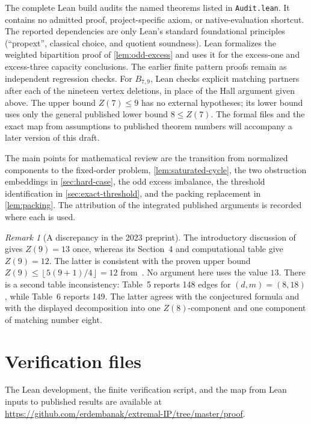 \documentclass[11pt]{article}
\theoremstyle{definition}
\theoremstyle{remark}
\newtheorem{remark}[theorem]{Remark}
\newcommand{\floor}[1]{\left\lfloor #1\right\rfloor}
\begin{document}
The complete Lean build audits the named theorems listed in
\texttt{Audit.lean}. It contains no admitted proof, project-specific axiom,
or native-evaluation shortcut. The reported dependencies are only Lean's
standard foundational principles
(``propext'', classical choice, and quotient soundness). Lean formalizes the
weighted bipartition proof of \cref{lem:odd-excess} and uses it for the
excess-one and excess-three capacity conclusions. The earlier finite pattern
proofs remain as independent regression checks.
For $B_{7,9}$, Lean checks explicit matching partners after each of the
nineteen vertex deletions, in place of the Hall argument given above.
The upper bound $Z(7)\le9$ has no external hypotheses; its lower bound uses
only the general published lower bound $8\le Z(7)$.
The formal files and the exact map from assumptions to published theorem
numbers will accompany a later version of this draft.

The main points for mathematical review are the transition from normalized
components to the fixed-order problem, \cref{lem:saturated-cycle}, the two
obstruction embeddings in \cref{sec:hard-case}, the odd excess imbalance,
the threshold identification in \cref{sec:exact-threshold}, and the packing
replacement in \cref{lem:packing}. The attribution of the integrated
published arguments is recorded where each is used.

\begin{remark}[A discrepancy in the 2023 preprint]
The introductory discussion of~\cite{BET2023} gives $Z(9)=13$ once, whereas
its Section~4 and computational table give $Z(9)=12$. The latter is consistent
with the proven upper bound
$Z(9)\le\floor{5(9+1)/4}=12$ from~\cite{AEY2022}. No argument here uses the
value $13$. There is a second table inconsistency: Table~5 reports 148 edges
for $(d,m)=(8,18)$, while Table~6 reports 149. The latter agrees with the
conjectured formula and with the displayed decomposition into one
$Z(8)$-component and one component of matching number eight.
\end{remark}

\section*{Verification files}

The Lean development, the finite verification script, and the map from Lean
inputs to published results are available at
\url{https://github.com/erdembanak/extremal-IP/tree/master/proof}.
\end{document}
